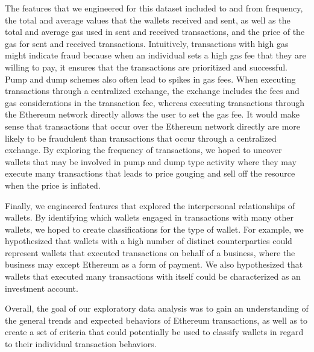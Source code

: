 \documentclass[sigconf]{acmart}
\begin{document}
The features that we engineered for this dataset included to and from frequency, the total and average values that the wallets received and sent, as well as the total and average gas used in sent and received transactions, and the price of the gas for sent and received transactions. Intuitively, transactions with high gas might indicate fraud because when an individual sets a high gas fee that they are willing to pay, it ensures that the transactions are prioritized and successful. Pump and dump schemes also often lead to spikes in gas fees. When executing transactions through a centralized exchange, the exchange includes the fees and gas considerations in the transaction fee, whereas executing transactions through the Ethereum network directly allows the user to set the gas fee. It would make sense that transactions that occur over the Ethereum network directly are more likely to be fraudulent than transactions that occur through a centralized exchange. By exploring the frequency of transactions, we hoped to uncover wallets that may be involved in pump and dump type activity where they may execute many transactions that leads to price gouging and sell off the resource when the price is inflated. 

Finally, we engineered features that explored the interpersonal relationships of wallets. By identifying which wallets engaged in transactions with many other wallets, we hoped to create classifications for the type of wallet. For example, we hypothesized that wallets with a high number of distinct counterparties could represent wallets that executed transactions on behalf of a business, where the business may except Ethereum as a form of payment. We also hypothesized that wallets that executed many transactions with itself could be characterized as an investment account.  

Overall, the goal of our exploratory data analysis was to gain an understanding of the general trends and expected behaviors of Ethereum transactions, as well as to create a set of criteria that could potentially be used to classify wallets in regard to their individual transaction behaviors. 
\end{document}
